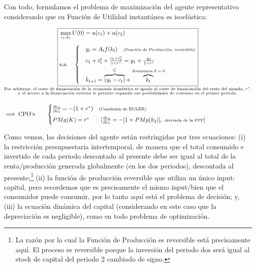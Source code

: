 \documentclass[10pt,a4paper]{article}
\begin{document}
Con todo, formulamos el problema de maximización del agente representativo considerando que su Función de Utilidad instantánea es isoelástica:

$$\begin{aligned}
    &\underset{\substack{\text{\scriptsize Por arbitraje, el coste de financiación de la economía doméstica se iguala al coste de financiación del resto del mundo, $r^*$,}\\\text{\scriptsize y el acceso a la financiación exterior le permite expandir sus posibilidades de consumo en el primer período.}}}{\boxed{
    \begin{aligned}
            &\max_{c_t,k_t}U(0)=u(c_1)+u(c_2)\\[0.5em]
        &\text{s.a.}\quad
        \begin{cases}
            &y_t=A_tf(k_t)\quad \text{\scriptsize (Función de Producción, reversible)}\\[0.5em]
            &c_1+i^o_1+\frac{c_2+i^o_2}{1+r^*}=y_1+\frac{y_2}{1+r^*}\\[0.5em]
            &\dot k_{t+1}=\overbrace{(y_t-c_t)}^{i^o_t}+\overbrace{k_t}^{\text{\scriptsize Asumimos $\delta=0$}}
        \end{cases}
    \end{aligned}
    }}\\[1em]
    &\Longrightarrow\;\text{CPO's}\qquad
    \begin{cases}
        \frac{\partial c_2}{\partial c_1}=-(1+r^*)\quad \text{\scriptsize(Condición de EULER)}\\[0.5em]
        PMg(K)=r^*\qquad [\frac{\partial c_2}{\partial c_1}=-[1+PMg(k_2)], \;\text{\scriptsize derivada de la FPP}]
    \end{cases}
\end{aligned}$$

Como vemos, las decisiones del agente están restringidas por tres ecuaciones: (i) la restricción presupuestaria intertemporal, de manera que el total consumido e invertido de cada periodo descontado al presente debe ser igual al total de la renta/producción generada globalmente (en los dos periodos), descontada al presente;\footnote{%
    La razón por la cual la Función de Producción es reversible está precisamente aquí. El proceso es reversible porque la inversión del periodo dos será igual al stock de capital del periodo 2 cambiado de signo.
} (ii) la función de producción reversible que utiliza un único input: capital, pero recordemos que es precisamente el mismo input/bien que el consumidor puede consumir, por lo tanto aquí está el problema de decisión; y, (iii) la ecuación dinámica del capital (considerando en este caso que la depreciación es negligible), como en todo problema de optimización. 
\end{document}
